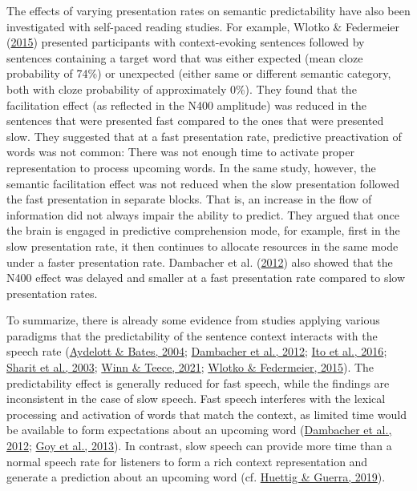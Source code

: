 \documentclass[a4paper, nobind]{templates/ociamthesis}
\begin{document}
The effects of varying presentation rates on semantic predictability have also been investigated with self-paced reading studies.
For example, Wlotko \& Federmeier (\protect\hyperlink{ref-Wlotko2015}{2015}) presented participants with context-evoking sentences followed by sentences containing a target word that was either expected (mean cloze probability of 74\%) or unexpected (either same or different semantic category, both with cloze probability of approximately 0\%).
They found that the facilitation effect (as reflected in the N400 amplitude) was reduced in the sentences that were presented fast compared to the ones that were presented slow.
They suggested that at a fast presentation rate, predictive preactivation of words was not common:
There was not enough time to activate proper representation to process upcoming words.
In the same study, however, the semantic facilitation effect was not reduced when the slow presentation followed the fast presentation in separate blocks.
That is, an increase in the flow of information did not always impair the ability to predict.
They argued that once the brain is engaged in predictive comprehension mode, for example, first in the slow presentation rate, it then continues to allocate resources in the same mode under a faster presentation rate.
Dambacher et al. (\protect\hyperlink{ref-Dambacher2012}{2012}) also showed that the N400 effect was delayed and smaller at a fast presentation rate compared to slow presentation rates.

To summarize, there is already some evidence from studies applying various paradigms that the predictability of the sentence context interacts with the speech rate (\protect\hyperlink{ref-Aydelott2004}{Aydelott \& Bates, 2004}; \protect\hyperlink{ref-Dambacher2012}{Dambacher et al., 2012}; \protect\hyperlink{ref-Ito2016}{Ito et al., 2016}; \protect\hyperlink{ref-Sharit2003}{Sharit et al., 2003}; \protect\hyperlink{ref-Winn2021}{Winn \& Teece, 2021}; \protect\hyperlink{ref-Wlotko2015}{Wlotko \& Federmeier, 2015}).
The predictability effect is generally reduced for fast speech, while the findings are inconsistent in the case of slow speech. Fast speech interferes with the lexical processing and activation of words that match the context, as limited time would be available to form expectations about an upcoming word (\protect\hyperlink{ref-Dambacher2012}{Dambacher et al., 2012}; \protect\hyperlink{ref-Goy2013}{Goy et al., 2013}).
In contrast, slow speech can provide more time than a normal speech rate for listeners to form a rich context representation and generate a prediction about an upcoming word (cf. \protect\hyperlink{ref-Huettig2019}{Huettig \& Guerra, 2019}).
\end{document}
